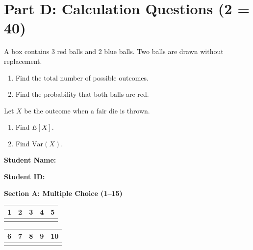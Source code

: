\documentclass{CWNUExam}
\begin{document}
\section{Part D: Calculation Questions (2  = 40)}

\begin{problem}
A box contains 3 red balls and 2 blue balls. Two balls are drawn without replacement.
\begin{enumerate}
\item Find the total number of possible outcomes.
\item Find the probability that both balls are red.
\end{enumerate}
\end{problem}

\begin{problem}
Let $X$ be the outcome when a fair die is thrown.
\begin{enumerate}
\item Find $E[X]$.
\item Find $\mathrm{Var}(X)$.
\end{enumerate}
\end{problem}


\newpage

\noindent\textbf{Student Name:} \underline{\hspace{6cm}}

\textbf{Student ID:} \underline{\hspace{6cm}}

\vspace{0.6cm}
\noindent\textbf{Section A: Multiple Choice (1--15)}\\[0.2cm]
\noindent
\begin{tabular}{|c|c|c|c|c|}
\hline
1 & 2 & 3 & 4 & 5  \\
\hline
\underline{\hspace{1.6cm}} & \underline{\hspace{1.6cm}} & \underline{\hspace{1.6cm}} & \underline{\hspace{1.6cm}} & \underline{\hspace{1.6cm}}  \\
\hline
\end{tabular}

\begin{tabular}{|c|c|c|c|c|}
\hline
6 & 7 & 8 & 9 & 10  \\
\hline
\underline{\hspace{1.6cm}} & \underline{\hspace{1.6cm}} & \underline{\hspace{1.6cm}} & \underline{\hspace{1.6cm}} & \underline{\hspace{1.6cm}}  \\
\hline
\end{tabular}
\end{document}
